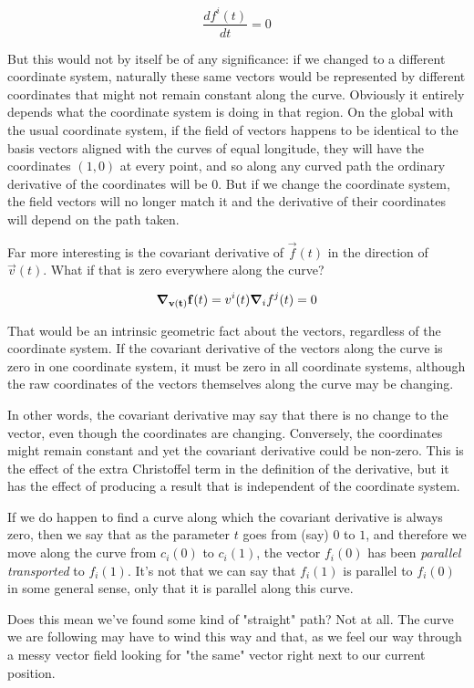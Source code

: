 $$
\frac{d f^i(t)}{dt} = 0
$$

But this would not by itself be of any significance: if we changed to a different coordinate system, naturally these same vectors would be represented by different coordinates that might not remain constant along the curve. Obviously it entirely depends what the coordinate system is doing in that region. On the global with the usual coordinate system, if the field of vectors happens to be identical to the basis vectors aligned with the curves of equal longitude, they will have the coordinates $(1, 0)$ at every point, and so along any curved path the ordinary derivative of the coordinates will be $0$. But if we change the coordinate system, the field vectors will no longer match it and the derivative of their coordinates will depend on the path taken.

Far more interesting is the covariant derivative of $\vec{f}(t)$ in the direction of $\vec{v}(t)$. What if that is zero everywhere along the curve?

$$
\grad_{\mathbf{v(t)}} \mathbf{f}(t)
=
v^i(t) \grad_i f^j(t) = 0
$$

That would be an intrinsic geometric fact about the vectors, regardless of the coordinate system. If the covariant derivative of the vectors along the curve is zero in one coordinate system, it must be zero in all coordinate systems, although the raw coordinates of the vectors themselves along the curve may be changing.

In other words, the covariant derivative may say that there is no change to the vector, even though the coordinates are changing. Conversely, the coordinates might remain constant and yet the covariant derivative could be non-zero. This is the effect of the extra Christoffel term in the definition of the derivative, but it has the effect of producing a result that is independent of the coordinate system.

If we do happen to find a curve along which the covariant derivative is always zero, then we say that as the parameter $t$ goes from (say) $0$ to $1$, and therefore we move along the curve from $c_i(0)$ to $c_i(1)$, the vector $f_i(0)$ has been \textit{parallel transported} to $f_i(1)$. It's not that we can say that $f_i(1)$ is parallel to $f_i(0)$ in some general sense, only that it is parallel along this curve.

Does this mean we've found some kind of "straight" path? Not at all. The curve we are following may have to wind this way and that, as we feel our way through a messy vector field looking for "the same" vector right next to our current position.


